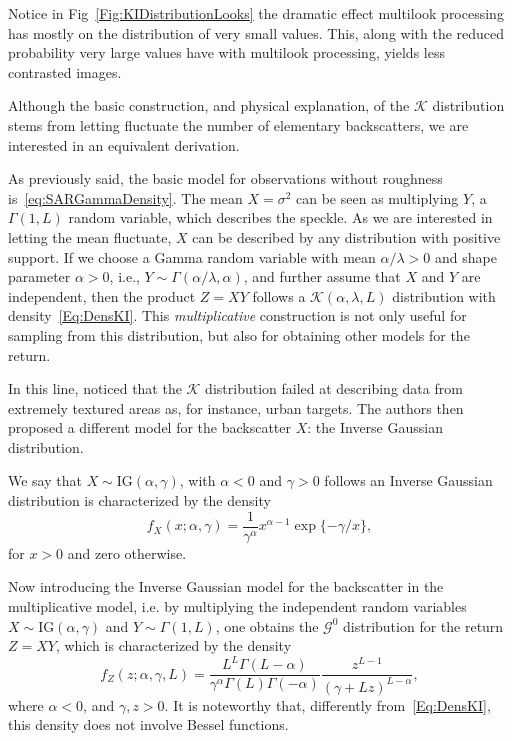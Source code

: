 Notice in Fig~\ref{Fig:KIDistributionLooks} the dramatic effect multilook processing has mostly on the distribution of very small values.
This, along with the reduced probability very large values have with multilook processing, yields less contrasted images.

Although the basic construction, and physical explanation, of the $\mathcal K$ distribution stems from letting fluctuate the number of elementary backscatters, we are interested in an equivalent derivation.

As previously said, the basic model for observations without roughness is~\eqref{eq:SARGammaDensity}.
The mean $X=\sigma^2$ can be seen as multiplying $Y$, a $\Gamma(1,L)$ random variable, which describes the speckle.
As we are interested in letting the mean fluctuate, $X$ can be described by any distribution with positive support.
If we choose a Gamma random variable with mean $\alpha/\lambda>0$ and shape parameter $\alpha>0$, i.e., $Y\sim\Gamma(\alpha/\lambda,\alpha)$, and further assume that $X$ and $Y$ are independent, then the product $Z=XY$ follows a $\mathcal{K}(\alpha,\lambda,L)$ distribution with density~\eqref{Eq:DensKI}.
This \textit{multiplicative} construction is not only useful for sampling from this distribution\cite{IGARSSChan2017}, but also for obtaining other models for the return.

In this line, \citet{frery96} noticed that the $\mathcal{K}$ distribution failed at describing data from extremely textured areas as, for instance, urban targets.
The authors then proposed a different model for the backscatter $X$: the Inverse Gaussian distribution.

We say that $X\sim\text{IG}(\alpha,\gamma)$, with $\alpha<0$ and $\gamma>0$ follows an Inverse Gaussian distribution is characterized by the density
\begin{equation}
f_X(x;\alpha,\gamma) = \frac{1}{\gamma^\alpha} x^{\alpha-1} \exp\{-\gamma/x\},
\label{Eq:IGdensity}
\end{equation}
for $x>0$ and zero otherwise.

Now introducing the Inverse Gaussian model for the backscatter in the multiplicative model, i.e. by multiplying the independent random variables $X\sim\text{IG}(\alpha,\gamma)$ and $Y\sim\Gamma(1,L)$, one obtains the $\mathcal{G}^0$ distribution for the return $Z=XY$, which is characterized by the density
\begin{equation}
f_Z(z; \alpha,\gamma,L) = \frac{L^L \Gamma(L-\alpha)}{\gamma^\alpha \Gamma(L)\Gamma(-\alpha)} \frac{z^{L-1}}{(\gamma+L z)^{L-\alpha}},
\label{Eq:DensGI0}
\end{equation}
where $\alpha<0$, and $\gamma,z>0$.
It is noteworthy that, differently from~\eqref{Eq:DensKI}, this density does not involve Bessel functions.

